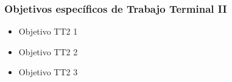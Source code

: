 
\subsubsection{Objetivos específicos de Trabajo Terminal II}

\begin{itemize}
    \item Objetivo TT2 1
    \item Objetivo TT2 2
    \item Objetivo TT2 3
\end{itemize}